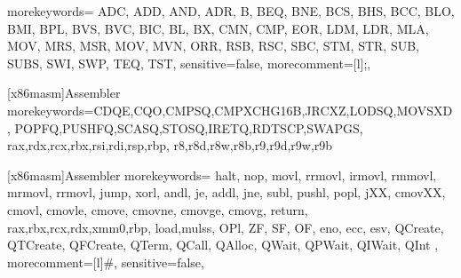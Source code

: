 {morekeywords={
	ADC, ADD, AND, ADR,
							B, BEQ, BNE, BCS, BHS, BCC, BLO, BMI, BPL, BVS, BVC,
			BIC, BL, BX, CMN, CMP, EOR, LDM, LDR, 
								MLA, MOV, MRS, MSR, MOV, MVN, ORR, RSB, RSC, SBC,
								STM, STR, SUB, SUBS,
								SWI, SWP, TEQ, TST},
sensitive=false,
morecomment=[l]{;},
}

   [x86masm]{Assembler} %
   {morekeywords={CDQE,CQO,CMPSQ,CMPXCHG16B,JRCXZ,LODSQ,MOVSXD, %
                  POPFQ,PUSHFQ,SCASQ,STOSQ,IRETQ,RDTSCP,SWAPGS, %
                  rax,rdx,rcx,rbx,rsi,rdi,rsp,rbp, %
                  r8,r8d,r8w,r8b,r9,r9d,r9w,r9b}} %


   [x86masm]{Assembler} %
   {morekeywords={ halt, nop, movl, rrmovl, irmovl, rmmovl, mrmovl, rrmovl, jump,%
                  xorl, andl, je, addl, jne, subl, pushl, popl, jXX,%
                  cmovXX, cmovl, cmovle, cmove, cmovne, cmovge, cmovg, return,%
                   rax,rbx,rcx,rdx,xmm0,rbp, load,mulss,%
                   OPl, ZF, SF, OF,%
                   eno, ecc, esv,
                   QCreate, QTCreate, QFCreate, QTerm, QCall, QAlloc,
                   QWait, QPWait, QIWait, QInt
                  },
      morecomment=[l]{\#},
      sensitive=false,
     } %

